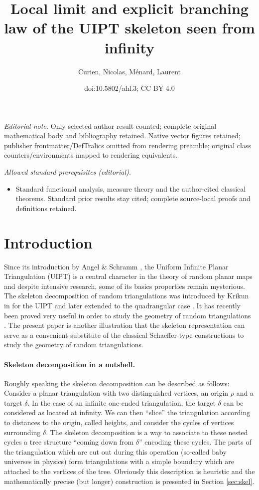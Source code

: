 \documentclass[10pt]{amsart}
\title{Local limit and explicit branching law of the UIPT skeleton seen from infinity}
\author{Curien, Nicolas, Ménard, Laurent}
\date{doi:10.5802/ahl.3; CC BY 4.0}
\theoremstyle{definition}\newtheorem{defi}[theo]{Definition}\newtheorem{rema}[theo]{Remark}\newtheorem{exam}[theo]{Example}\newtheorem{exem}[theo]{Example}\newtheorem{nota}[theo]{Notation}
\begin{document}
\maketitle
\noindent\textit{Editorial note.} Only selected author result counted; complete original mathematical body and bibliography retained. Native vector figures retained; publisher frontmatter/DefTralics omitted from rendering preamble; original class counters/environments mapped to rendering equivalents.\par\medskip
\noindent\textit{Allowed standard prerequisites (editorial).}\begin{itemize}
\item Standard functional analysis, measure theory and the author-cited classical theorems. Standard prior results stay cited; complete source-local proofs and definitions retained.
\end{itemize}\medskip
\section{Introduction}
Since its introduction by Angel \& Schramm \cite{AS}, the Uniform Infinite Planar Triangulation (UIPT) is a central character in the theory of random planar maps and despite intensive research, some of its basics properties remain mysterious. The skeleton decomposition of random triangulations was introduced by Krikun in \cite{Kr} for the UIPT and later extended to the quadrangular case \cite{Kr,LGL17}. It has recently been proved very useful in order to study the geometry of random triangulations  \cite{CLGfpp,AR,LGL17,Budzinski18,M}. The present paper is another illustration that the skeleton representation can serve as a convenient substitute of the classical Schaeffer-type constructions to study the geometry of random triangulations.

\paragraph{Skeleton decomposition in a nutshell.} Roughly speaking the skeleton decomposition can be described as follows: Consider a planar triangulation with two distinguished vertices, an origin $\rho$ and a target $\delta$. In the case of an infinite one-ended triangulation, the target $\delta$ can be considered as located at infinity. We can then ``slice'' the triangulation according to distances to the origin, called heights, and consider the cycles of vertices surrounding $\delta$. The skeleton decomposition is a way to associate to these nested cycles a tree structure ``coming down from $\delta$'' encoding these cycles. The parts of the triangulation which are cut out during this operation (so-called baby universes in physics) form triangulations with a simple boundary  which are attached to the vertices of the tree. Obviously this description is heuristic  and the mathematically precise (but longer) construction is presented in Section \ref{sec:skel}.
\end{document}
